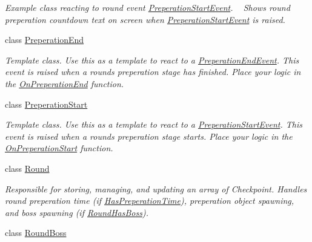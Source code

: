 \begin{DoxyCompactItemize}
\begin{DoxyCompactList}\small\item\em Example class reacting to round event \hyperlink{class_round_manager_1_1_events_1_1_preperation_start_event}{Preperation\+Start\+Event}. ~\newline
Shows round preperation countdown text on screen when \hyperlink{class_round_manager_1_1_events_1_1_preperation_start_event}{Preperation\+Start\+Event} is raised. \end{DoxyCompactList}\item 
class \hyperlink{class_round_manager_1_1_preperation_end}{Preperation\+End}
\begin{DoxyCompactList}\small\item\em Template class. Use this as a template to react to a \hyperlink{class_round_manager_1_1_events_1_1_preperation_end_event}{Preperation\+End\+Event}. This event is raised when a rounds preperation stage has finished. Place your logic in the \hyperlink{class_round_manager_1_1_preperation_end_a6d57cf26e3d2760d58d9dd94f674634c}{On\+Preperation\+End} function. \end{DoxyCompactList}\item 
class \hyperlink{class_round_manager_1_1_preperation_start}{Preperation\+Start}
\begin{DoxyCompactList}\small\item\em Template class. Use this as a template to react to a \hyperlink{class_round_manager_1_1_events_1_1_preperation_start_event}{Preperation\+Start\+Event}. This event is raised when a rounds preperation stage starts. Place your logic in the \hyperlink{class_round_manager_1_1_preperation_start_a797df8dcc24c26b43bbe77bd36f3b109}{On\+Preperation\+Start} function. \end{DoxyCompactList}\item 
class \hyperlink{class_round_manager_1_1_round}{Round}
\begin{DoxyCompactList}\small\item\em Responsible for storing, managing, and updating an array of Checkpoint. Handles round preperation time (if \hyperlink{class_round_manager_1_1_round_a711e1825e6d269ab0308a79cf25ee8d1}{Has\+Preperation\+Time}), preperation object spawning, and boss spawning (if \hyperlink{class_round_manager_1_1_round_a3e8205a74f196546906314f802f41127}{Round\+Has\+Boss}). \end{DoxyCompactList}\item 
class \hyperlink{class_round_manager_1_1_round_boss}{Round\+Boss}

\end{DoxyCompactItemize}
